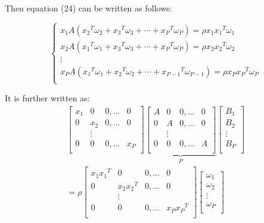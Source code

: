 \documentclass[journal]{IEEEtran}
\begin{document}
Then equation (24) can be written as follows:
\begin{small}
\begin{equation}
\left\{ {\begin{array}{*{20}{c}}
   {{x_1}A({x_2}^T{\omega _2} + {x_3}^T{\omega _3} +  \cdots  + {x_P}^T{\omega _P}) = {\rho}{x_1}{x_1}^T{\omega _1}}  \\
   {{x_2}A({x_1}^T{\omega _1} + {x_3}^T{\omega _3} +  \cdots  + {x_P}^T{\omega _P}) = {\rho}{x_2}{x_2}^T{\omega _2}}  \\
    \vdots   \\
   {{x_P}A({x_1}^T{\omega _1} + {x_2}^T{\omega _2} +  \cdots  + {x_{P - 1}}^T{\omega _{P - 1}}) = {\rho}{x_P}{x_P}^T{\omega _P}}  \\
\end{array}} \right.
\end{equation}
\end{small}
It is further written as:
\begin{equation}
\begin{array}{l}
 \left[ {\begin{array}{*{20}{c}}
   {{x_1}} & 0 & {0,...} & 0  \\
   0 & {{x_2}} & {0,...} & 0  \\
   {} &  \vdots  & {} & {}  \\
   0 & 0 & {0,...} & {{x_P}}  \\
\end{array}} \right]\underbrace {\left[ {\begin{array}{*{20}{c}}
   A & 0 & {0,...} & 0  \\
   0 & A & {0,...} & 0  \\
   {} &  \vdots  & {} & {}  \\
   0 & 0 & {0,...} & A  \\
\end{array}} \right]}_P\left[ {\begin{array}{*{20}{c}}
   {{B_1}}  \\
   {{B_2}}  \\
    \vdots   \\
   {{B_P}}  \\
\end{array}} \right] \\
  = \rho \left[ {\begin{array}{*{20}{c}}
   {{x_1}{x_1}^T} & 0 & {0,...} & 0  \\
   0 & {{x_2}{x_2}^T} & {0,...} & 0  \\
   {} &  \vdots  & {} & {}  \\
   0 & 0 & {0,...} & {{x_P}{x_P}^T}  \\
\end{array}} \right]\left[ {\begin{array}{*{20}{c}}
   {{\omega _1}}  \\
   {{\omega _2}}  \\
    \vdots   \\
   {{\omega _P}}  \\
\end{array}} \right] \\
 \end{array}
\end{equation}
\end{document}

